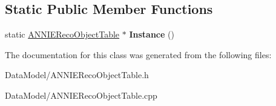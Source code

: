 \subsection*{Static Public Member Functions}
\begin{DoxyCompactItemize}
\item 
\hypertarget{classANNIERecoObjectTable_a2d52c0a9b2ed24f59c97ae6cfff3b1f6}{
static \hyperlink{classANNIERecoObjectTable}{ANNIERecoObjectTable} $\ast$ {\bfseries Instance} ()}
\label{classANNIERecoObjectTable_a2d52c0a9b2ed24f59c97ae6cfff3b1f6}

\end{DoxyCompactItemize}


The documentation for this class was generated from the following files:\begin{DoxyCompactItemize}
\item 
DataModel/ANNIERecoObjectTable.h\item 
DataModel/ANNIERecoObjectTable.cpp\end{DoxyCompactItemize}
